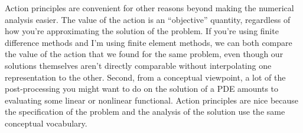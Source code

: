 \documentclass{article}
\theoremstyle{definition}
\theoremstyle{plain}
\begin{document}
Action principles are convenient for other reasons beyond making the numerical analysis easier.
The value of the action is an ``objective'' quantity, regardless of how you're approximating the solution of the problem.
If you're using finite difference methods and I'm using finite element methods, we can both compare the value of the action that we found for the same problem, even though our solutions themselves aren't directly comparable without interpolating one representation to the other.
Second, from a conceptual viewpoint, a lot of the post-processing you might want to do on the solution of a PDE amounts to evaluating some linear or nonlinear functional.
Action principles are nice because the specification of the problem and the analysis of the solution use the same conceptual vocabulary.
\end{document}
